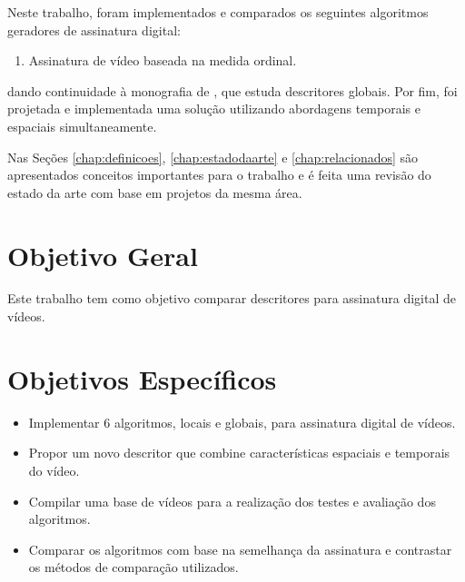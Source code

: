 Neste trabalho, foram implementados e comparados os seguintes algoritmos geradores de assinatura digital: 
\begin{enumerate}
\item Assinatura de vídeo baseada na medida ordinal.
\end{enumerate}
    
dando continuidade à monografia de \citeauthor{sylvio2015}, que estuda descritores globais. Por fim, foi projetada e implementada uma solução utilizando abordagens temporais e espaciais simultaneamente.
    

Nas Seções \ref{chap:definicoes}, \ref{chap:estadodaarte} e \ref{chap:relacionados} são apresentados conceitos importantes para o trabalho e é feita uma revisão do estado da arte com base em projetos da mesma área.


\section{Objetivo Geral}
Este trabalho tem como objetivo comparar descritores para assinatura digital de vídeos.

\section{Objetivos Específicos}
\begin{itemize}
\item Implementar 6 algoritmos, locais e globais, para assinatura digital de vídeos.
\item Propor um novo descritor que combine características espaciais e temporais do vídeo.
\item Compilar uma base de vídeos para a realização dos testes e avaliação dos algoritmos.
\item Comparar os algoritmos com base na semelhança da assinatura e contrastar os métodos de comparação utilizados.
\end{itemize}

